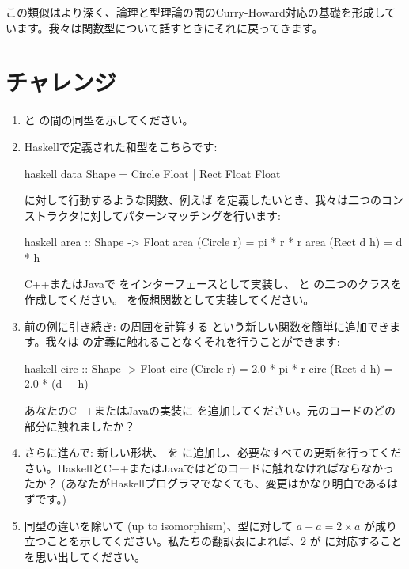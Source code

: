 \noindent
この類似はより深く、論理と型理論の間のCurry-Howard対応の基礎を形成しています。我々は関数型について話すときにそれに戻ってきます。

\section{チャレンジ}

\begin{enumerate}
  \tightlist
  \item
         と  の間の同型を示してください。
  \item
        Haskellで定義された和型をこちらです: 

        \begin{snip}{haskell}
data Shape = Circle Float 
           | Rect Float Float
\end{snip}
         に対して行動するような関数、例えば  を定義したいとき、我々は二つのコンストラクタに対してパターンマッチングを行います: 

        \begin{snip}{haskell}
area :: Shape -> Float
area (Circle r) = pi * r * r
area (Rect d h) = d * h
\end{snip}
        C++またはJavaで  をインターフェースとして実装し、 と  の二つのクラスを作成してください。 を仮想関数として実装してください。
  \item
        前の例に引き続き:  の周囲を計算する  という新しい関数を簡単に追加できます。我々は  の定義に触れることなくそれを行うことができます: 

        \begin{snip}{haskell}
circ :: Shape -> Float
circ (Circle r) = 2.0 * pi * r
circ (Rect d h) = 2.0 * (d + h)
\end{snip}
        あなたのC++またはJavaの実装に  を追加してください。元のコードのどの部分に触れましたか？
  \item
        さらに進んで: 新しい形状、 を  に追加し、必要なすべての更新を行ってください。HaskellとC++またはJavaではどのコードに触れなければならなかったか？ (あなたがHaskellプログラマでなくても、変更はかなり明白であるはずです。) 
  \item
        同型の違いを除いて (up to isomorphism)、型に対して $a + a = 2 \times a$ が成り立つことを示してください。私たちの翻訳表によれば、$2$ が  に対応することを思い出してください。
\end{enumerate}

